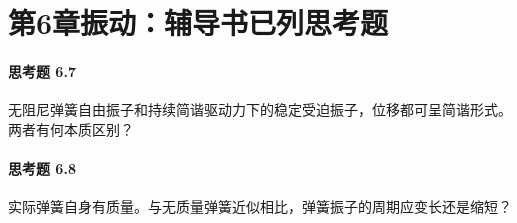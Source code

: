 \section*{第6章\quad 振动：辅导书已列思考题}
\paragraph{思考题 6.7}
无阻尼弹簧自由振子和持续简谐驱动力下的稳定受迫振子，位移都可呈简谐形式。两者有何本质区别？

\paragraph{思考题 6.8}
实际弹簧自身有质量。与无质量弹簧近似相比，弹簧振子的周期应变长还是缩短？
